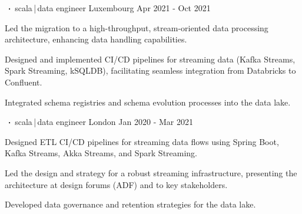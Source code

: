 \begin{cventries}

    \cventry
    {     }
    {$\sqbig$scala\,|\,data engineer}
    {Luxembourg}
    {Apr 2021 - Oct 2021}
    {}
    {
        \begin{cvitems}
            \item{Led the migration to a high-throughput, stream-oriented data processing architecture, enhancing data handling capabilities.}
            \item{Designed and implemented CI/CD pipelines for streaming data (Kafka Streams, Spark Streaming, kSQLDB), facilitating seamless integration from Databricks to Confluent.}
            \item{Integrated schema registries and schema evolution processes into the data lake.}
        \end{cvitems}
    }

    \cventry
    {      }
    {$\sqbig$scala\,|\,data engineer}
    {London}
    {Jan 2020 - Mar 2021}
    {}
    {
        \begin{cvitems}
            \item{Designed ETL CI/CD pipelines for streaming data flows using Spring Boot, Kafka Streams, Akka Streams, and Spark Streaming.}
            \item{Led the design and strategy for a robust streaming infrastructure, presenting the architecture at design forums (ADF) and to key stakeholders.}
            \item{Developed data governance and retention strategies for the data lake.}
        \end{cvitems}
    }


\end{cventries}

